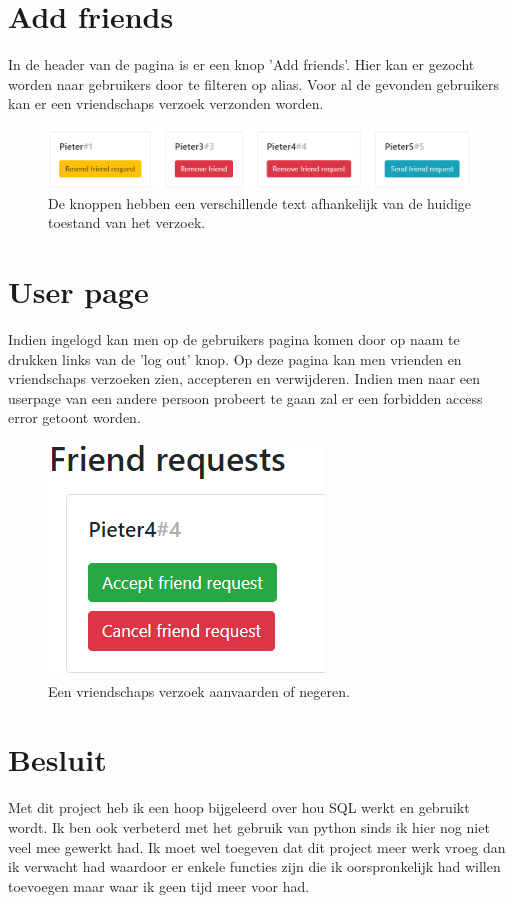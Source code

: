 \documentclass[12px]{article}
\begin{document}
\newpage
\section{Add friends}
In de header van de pagina is er een knop 'Add friends'. Hier kan er gezocht worden naar gebruikers door te filteren op alias. Voor al de gevonden gebruikers kan er een vriendschaps verzoek verzonden worden.
\begin{figure}[!h]
\includegraphics[width=\textwidth]{user-search}
\caption{De knoppen hebben een verschillende text afhankelijk van de huidige toestand van het verzoek.}
\end{figure}
\FloatBarrier

\section{User page}
Indien ingelogd kan men op de gebruikers pagina komen door op naam te drukken links van de 'log out' knop. Op deze pagina kan men vrienden en vriendschaps verzoeken zien, accepteren en verwijderen. Indien men naar een userpage van een andere persoon probeert te gaan zal er een forbidden access error getoont worden.
\begin{figure}[!hbp]
\includegraphics[width=.3\textwidth]{vriendschapsverzoek}
\centering
\caption{Een vriendschaps verzoek aanvaarden of negeren.}
\end{figure}
\FloatBarrier

\section{Besluit}
Met dit project heb ik een hoop bijgeleerd over hou SQL werkt en gebruikt wordt. Ik ben ook verbeterd met het gebruik van python sinds ik hier nog niet veel mee gewerkt had. Ik moet wel toegeven dat dit project meer werk vroeg dan ik verwacht had waardoor er enkele functies zijn die ik oorspronkelijk had willen toevoegen maar waar ik geen tijd meer voor had. 
\end{document}
